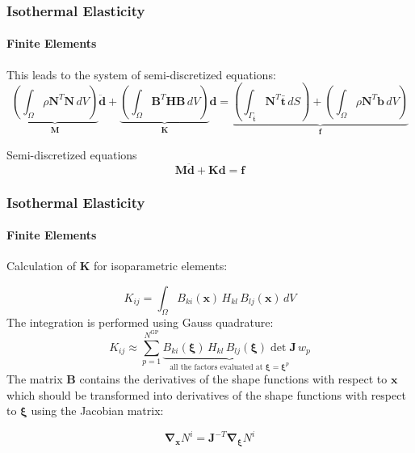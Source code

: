 \documentclass[10pt,xcolor=pdftex,dvipsnames,table]{beamer}
\begin{document}
\begin{frame}
	\frametitle{ Isothermal Elasticity }
	\framesubtitle{ Finite Elements }
	
	This leads to the system of semi-discretized equations:
	\begin{equation*}
			\underbrace{\left( \int_{\Omega} \rho \mathbf{N}^T\mathbf{N}\, dV \right)}_{\mathbf{M}} \ddot{\boldsymbol{d}}
	+  \underbrace{\left(\int_{\Omega}\mathbf{B}^T\mathbf{H}\mathbf{B} \, dV \right)}_{\mathbf{K}} \boldsymbol{d}		
= 
			 \underbrace{\left( \int_{\Gamma_{\bar{\boldsymbol{t}}}} \mathbf{N}^T\boldsymbol{\bar{t}}\, dS \right)
+  \left( \int_{\Omega} \rho\mathbf{N}^T\boldsymbol{b}\, dV \right)}_{\boldsymbol{f}}
	\end{equation*}		
	
		
	\begin{block}{Semi-discretized equations}	
		\begin{equation*}
			\mathbf{M}\ddot{\boldsymbol{d}}+\mathbf{K}\boldsymbol{d}=\boldsymbol{f}
		\end{equation*}	
	\end{block}

\end{frame}



\begin{frame}
	\frametitle{ Isothermal Elasticity }
	\framesubtitle{ Finite Elements }
	
	Calculation of $\mathbf{K}$ for isoparametric elements:
	
	\begin{equation*}
		K_{ij} = \int_{\Omega} B_{ki}(\boldsymbol{x})\,H_{kl}\,B_{lj}(\boldsymbol{x}) \, dV
	\end{equation*}		
	The integration is performed using Gauss quadrature:
	\begin{equation*}
		K_{ij} \approx \sum_{p=1}^{N^{\text{GP}}} \underbrace{
			B_{ki}(\boldsymbol{\xi})\,H_{kl}\,B_{lj}(\boldsymbol{\xi})
			\det \mathbf{J}
		}_{\text{all the factors evaluated at } \boldsymbol{\xi}=\boldsymbol{\xi}^p} \,w_p
	\end{equation*}		
	The matrix $\mathbf{B}$ contains the derivatives of the shape functions with respect to $\boldsymbol{x}$ which should be transformed into derivatives of the shape functions with respect to $\boldsymbol{\xi}$ using the Jacobian matrix:
	
	\begin{equation*}
		\boldsymbol{\nabla}_{\boldsymbol{x}} N^i = \mathbf{J}^{-T} \boldsymbol{\nabla}_{\boldsymbol{\xi}} N^i
	\end{equation*}	
\end{frame}
\end{document}
